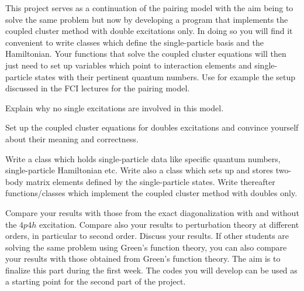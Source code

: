 \begin{prob}
This project serves as a continuation
of the pairing model with the aim being to solve the same problem but
now by developing a program that implements the coupled cluster method
with double excitations only. In doing so you will find it convenient
to write classes which define the single-particle basis and the
Hamiltonian. Your functions that solve the coupled cluster equations
will then just need to set up variables which point to interaction
elements and single-particle states with their pertinent quantum
numbers. Use for example the setup discussed in the FCI lectures for
the pairing model.


Explain why no single excitations are involved in this model.



Set up the coupled cluster equations for doubles excitations and convince yourself about their
meaning and correctness.

Write a class which holds
single-particle data like specific quantum numbers, single-particle
Hamiltonian etc. Write also a class which sets up and stores two-body
matrix elements defined by the single-particle states.  Write
thereafter functions/classes which implement the coupled cluster
method with doubles only.



Compare your results with
those from the exact diagonalization with and without the $4p4h$
excitation. Compare also your results to perturbation theory at
different orders, in particular to second order. Discuss your results.
If other students are solving the same problem using Green's function
theory, you can also compare your results with those obtained from
Green's function theory. The aim is to finalize this part during the
first week. The codes you will develop can be used as a starting point
for the second part of the project.

\end{prob}

